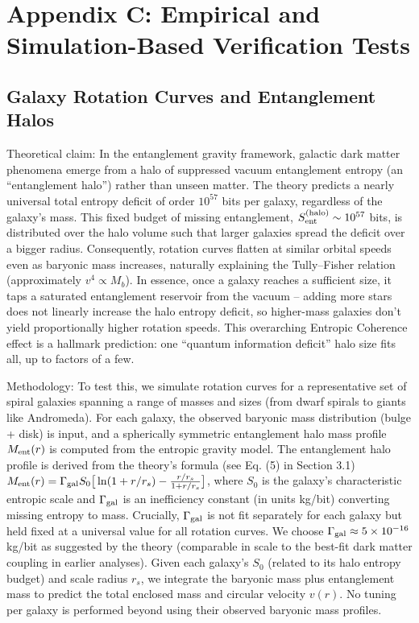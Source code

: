 \documentclass[11pt]{article}
\begin{document}
\section*{Appendix C: Empirical and Simulation-Based Verification Tests} %

\subsection*{Galaxy Rotation Curves and Entanglement Halos}

Theoretical claim: In the entanglement gravity framework, galactic dark matter phenomena emerge from a halo of suppressed vacuum entanglement entropy (an “entanglement halo”) rather than unseen matter. The theory predicts a nearly universal total entropy deficit of order $10^{57}$ bits per galaxy, regardless of the galaxy’s mass. This fixed budget of missing entanglement, $S_{\rm ent}^{\rm (halo)} \sim 10^{57}$ bits, is distributed over the halo volume such that larger galaxies spread the deficit over a bigger radius. Consequently, rotation curves flatten at similar orbital speeds even as baryonic mass increases, naturally explaining the Tully–Fisher relation (approximately $v^4 \propto M_b$). In essence, once a galaxy reaches a sufficient size, it taps a saturated entanglement reservoir from the vacuum – adding more stars does not linearly increase the halo entropy deficit, so higher-mass galaxies don’t yield proportionally higher rotation speeds. This overarching Entropic Coherence effect is a hallmark prediction: one “quantum information deficit” halo size fits all, up to factors of a few.

Methodology: To test this, we simulate rotation curves for a representative set of spiral galaxies spanning a range of masses and sizes (from dwarf spirals to giants like Andromeda). For each galaxy, the observed baryonic mass distribution (bulge + disk) is input, and a spherically symmetric entanglement halo mass profile $M_{\rm ent}(r)$ is computed from the entropic gravity model. The entanglement halo profile is derived from the theory’s formula (see Eq. (5) in Section 3.1) $M_{\rm ent}(r) = \Gamma_{\rm gal} S_0 \big[\ln(1+r/r_s) - \frac{r/r_s}{1+r/r_s}\big]$, where $S_0$ is the galaxy’s characteristic entropic scale and $\Gamma_{\rm gal}$ is an inefficiency constant (in units kg/bit) converting missing entropy to mass. Crucially, $\Gamma_{\rm gal}$ is not fit separately for each galaxy but held fixed at a universal value for all rotation curves. We choose $\Gamma_{\rm gal} \approx 5\times10^{-16}$ kg/bit as suggested by the theory (comparable in scale to the best-fit dark matter coupling in earlier analyses). Given each galaxy’s $S_0$ (related to its halo entropy budget) and scale radius $r_s$, we integrate the baryonic mass plus entanglement mass to predict the total enclosed mass and circular velocity $v(r)$. No tuning per galaxy is performed beyond using their observed baryonic mass profiles.
\end{document}
